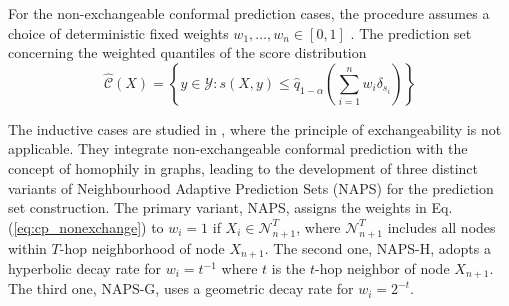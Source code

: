 For the non-exchangeable conformal prediction cases,
the procedure assumes a choice of deterministic fixed weights $w_1,\dots,w_n \in [0,1]$ \cite{barber2023conformal}.
The prediction set concerning the weighted 
quantiles of the score distribution 
\begin{equation}
\label{eq:cp_nonexchange}
    \hat{\mathcal{C}}(X) = \left\{ y\in\mathcal{Y}: s(X,y)\leq  \hat{q}_{1-\alpha} \left( \sum_{i=1}^n w_i \delta_{s_i}
    \right) \right\}
\end{equation}

The inductive cases are studied in \cite{clarkson2023distribution},
where the principle of exchangeability is not applicable.
They integrate non-exchangeable conformal prediction with the concept of homophily in graphs, 
leading to the development of three distinct variants of Neighbourhood Adaptive Prediction Sets (NAPS) for the prediction set construction.
The primary variant, NAPS, assigns the weights in Eq. (\ref{eq:cp_nonexchange}) to
$w_i=1$ if $X_i \in \mathcal{N}_{n+1}^T $, where $\mathcal{N}_{n+1}^T$ includes all nodes within $T$-hop neighborhood of node $X_{n+1}$. 
The second one, NAPS-H, adopts a hyperbolic decay rate for $w_i=t^{-1}$ where $t$ is the $t$-hop neighbor of node $X_{n+1}$.
The third one, NAPS-G, uses a geometric decay rate for $w_i=2^{-t}$.

